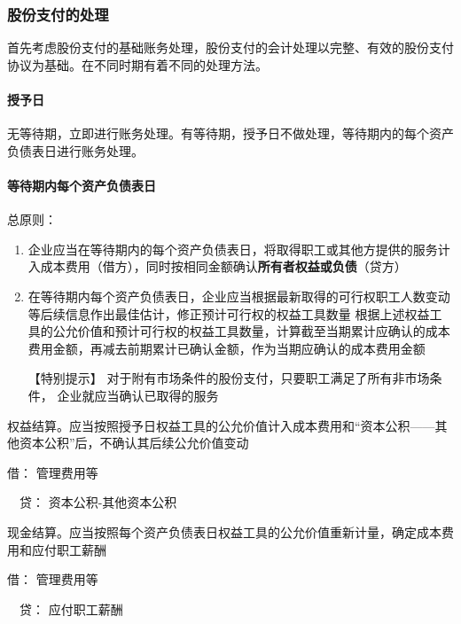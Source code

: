 \documentclass[UTF8,12pt]{ctexart}
\newenvironment{Dr}{\noindent 借：}{\par}
\newenvironment{Cr}{\noindent \ \ 贷：}{\par}
\numberwithin{equation}{section} %
\numberwithin{figure}{section}
\numberwithin{table}{section}
\begin{document}
	\subsubsection{股份支付的处理}
	首先考虑股份支付的基础账务处理，股份支付的会计处理以完整、有效的股份支付协议为基础。在不同时期有着不同的处理方法。
	
	\paragraph{授予日}
	无等待期，立即进行账务处理。有等待期，授予日不做处理，等待期内的每个资产负债表日进行账务处理。
	
	\paragraph{等待期内每个资产负债表日}
	总原则：
	\begin{enumerate}
		\item 企业应当在等待期内的每个资产负债表日，将取得职工或其他方提供的服务计入成本费用（借方），同时按相同金额确认\textbf{所有者权益或负债}（贷方）
		
		\item 在等待期内每个资产负债表日，企业应当根据最新取得的可行权职工人数变动等后续信息作出最佳估计，修正预计可行权的权益工具数量
		根据上述权益工具的公允价值和预计可行权的权益工具数量，计算截至当期累计应确认的成本费用金额，再减去前期累计已确认金额，作为当期应确认的成本费用金额
		
		【特别提示】
		对于附有市场条件的股份支付，只要职工满足了所有非市场条件， 企业就应当确认已取得的服务
		
	\end{enumerate}

	权益结算。应当按照授予日权益工具的公允价值计入成本费用和“资本公积——其他资本公积”后，不确认其后续公允价值变动
	
	\begin{Dr}
		管理费用等
	\end{Dr}
	\begin{Cr}
		资本公积-其他资本公积
	\end{Cr}
	
	现金结算。应当按照每个资产负债表日权益工具的公允价值重新计量，确定成本费用和应付职工薪酬
	
	\begin{Dr}
		管理费用等
	\end{Dr}
	\begin{Cr}
		应付职工薪酬
	\end{Cr}
	
\end{document}
